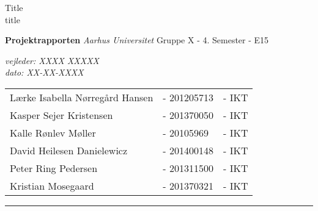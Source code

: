 \begin{titlingpage}

\noindent
\titlefont Title \\[0.7\baselineskip] title\par
\epigraph{
\textbf{Projektrapporten}\newline
\textit{Aarhus Universitet}\newline
Gruppe X - 4. Semester - E15\newline
}%
{\textit{vejleder: XXXX XXXXX}\\
\textit{dato: XX-XX-XXXX}}
\null\vfill
\vspace*{1cm}
\noindent

\begin{minipage}{0.64\linewidth}
    \begin{flushleft}
		\normalsize
		\begin{tabular}{l l l}
			  Lærke Isabella Nørregård Hansen 		&- 201205713 	&- IKT \\
			  Kasper Sejer Kristensen				&- 201370050	&- IKT \\
			  Kalle Rønlev Møller					&- 20105969		&- IKT \\
			  David Heilesen Danielewicz			&- 201400148	&- IKT \\
			  Peter Ring Pedersen					&- 201311500	&- IKT \\
			  Kristian Mosegaard					&- 201370321	&- IKT
		\end{tabular}
    \end{flushleft}
\end{minipage}
%
\begin{minipage}{0.02\linewidth}
    \rule{1pt}{90pt}
\end{minipage}
\titlepagedecoration
\end{titlingpage}
